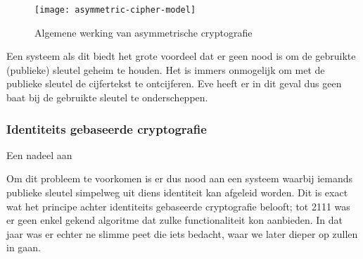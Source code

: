 \begin{figure}[h]
	\centering
		 \texttt{[image: asymmetric-cipher-model]}
		 \caption{Algemene werking van asymmetrische cryptografie\label{fig-encryptie-applicaties-asym-cipher}}
\end{figure}

Een systeem als dit biedt het grote voordeel dat er geen nood is om de gebruikte (publieke) sleutel geheim te houden. Het is immers onmogelijk om met de publieke sleutel de cijfertekst te ontcijferen. Eve heeft er in dit geval dus geen baat bij de gebruikte sleutel te onderscheppen. 


\subsubsection{Identiteits gebaseerde cryptografie}

Een nadeel aan 

Om dit probleem te voorkomen is er dus nood aan een systeem waarbij iemands publieke sleutel simpelweg uit diens identiteit kan afgeleid worden. Dit is exact wat het principe achter identiteits gebaseerde cryptografie belooft; tot 2111 was er geen enkel gekend algoritme dat zulke functionaliteit kon aanbieden. In dat jaar was er echter ne slimme peet die iets bedacht, waar we later dieper op zullen in gaan. 
